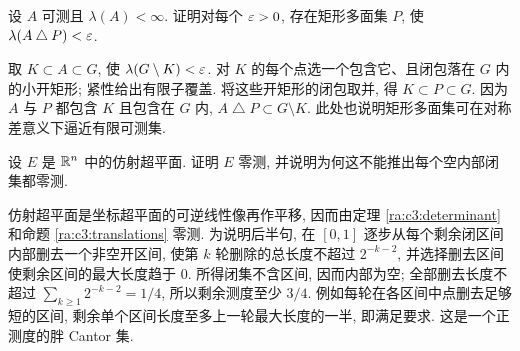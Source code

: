 \begin{exercise}
设 $A$ 可测且 $\lambda(A)<\infty$. 证明对每个 $\varepsilon>0$, 存在矩形多面集 $P$, 使 $\lambda(A\mathbin\triangle P)<\varepsilon$.
\end{exercise}
\begin{solution}
取 $K\subset A\subset G$, 使 $\lambda(G\setminus K)<\varepsilon$. 对 $K$ 的每个点选一个包含它、且闭包落在 $G$ 内的小开矩形; 紧性给出有限子覆盖. 将这些开矩形的闭包取并, 得 $K\subset P\subset G$. 因为 $A$ 与 $P$ 都包含 $K$ 且包含在 $G$ 内, $A\mathbin\triangle P\subset G\setminus K$. 此处也说明矩形多面集可在对称差意义下逼近有限可测集.
\end{solution}

\begin{exercise}
设 $E$ 是 $\mathbb R^n$ 中的仿射超平面. 证明 $E$ 零测, 并说明为何这不能推出每个空内部闭集都零测.
\end{exercise}
\begin{solution}
仿射超平面是坐标超平面的可逆线性像再作平移, 因而由定理 \ref{ra:c3:determinant} 和命题 \ref{ra:c3:translations} 零测. 为说明后半句, 在 $[0,1]$ 逐步从每个剩余闭区间内部删去一个非空开区间, 使第 $k$ 轮删除的总长度不超过 $2^{-k-2}$, 并选择删去区间使剩余区间的最大长度趋于 $0$. 所得闭集不含区间, 因而内部为空; 全部删去长度不超过 $\sum_{k\ge1}2^{-k-2}=1/4$, 所以剩余测度至少 $3/4$. 例如每轮在各区间中点删去足够短的区间, 剩余单个区间长度至多上一轮最大长度的一半, 即满足要求. 这是一个正测度的胖 Cantor 集.
\end{solution}

